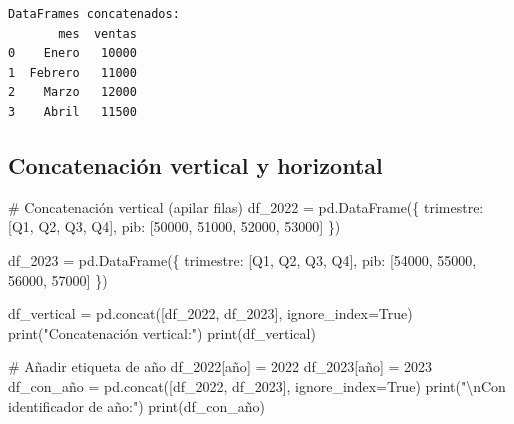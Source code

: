 \documentclass[
  doc,
  floatsintext,
  longtable,
  a4paper,
  nolmodern,
  notxfonts,
  notimes,
  12pt,
  colorlinks=true,linkcolor=blue,citecolor=blue,urlcolor=blue]{apa7}
\newenvironment{Shaded}{\begin{snugshade}}{\end{snugshade}}
\newcommand{\BuiltInTok}[1]{\textcolor[rgb]{0.00,0.23,0.31}{#1}}
\newcommand{\CharTok}[1]{\textcolor[rgb]{0.13,0.47,0.30}{#1}}
\newcommand{\CommentTok}[1]{\textcolor[rgb]{0.37,0.37,0.37}{#1}}
\newcommand{\DecValTok}[1]{\textcolor[rgb]{0.68,0.00,0.00}{#1}}
\newcommand{\NormalTok}[1]{\textcolor[rgb]{0.00,0.23,0.31}{#1}}
\newcommand{\OperatorTok}[1]{\textcolor[rgb]{0.37,0.37,0.37}{#1}}
\newcommand{\StringTok}[1]{\textcolor[rgb]{0.13,0.47,0.30}{#1}}
\newcommand{\VariableTok}[1]{\textcolor[rgb]{0.07,0.07,0.07}{#1}}
\begin{document}
\begin{verbatim}
DataFrames concatenados:
       mes  ventas
0    Enero   10000
1  Febrero   11000
2    Marzo   12000
3    Abril   11500
\end{verbatim}

\subsection{Concatenación vertical y
horizontal}\label{concatenaciuxf3n-vertical-y-horizontal}

\begin{Shaded}
\begin{Highlighting}[]
\CommentTok{\# Concatenación vertical (apilar filas)}
\NormalTok{df\_2022 }\OperatorTok{=}\NormalTok{ pd.DataFrame(\{}
    \StringTok{\textquotesingle{}trimestre\textquotesingle{}}\NormalTok{: [}\StringTok{\textquotesingle{}Q1\textquotesingle{}}\NormalTok{, }\StringTok{\textquotesingle{}Q2\textquotesingle{}}\NormalTok{, }\StringTok{\textquotesingle{}Q3\textquotesingle{}}\NormalTok{, }\StringTok{\textquotesingle{}Q4\textquotesingle{}}\NormalTok{],}
    \StringTok{\textquotesingle{}pib\textquotesingle{}}\NormalTok{: [}\DecValTok{50000}\NormalTok{, }\DecValTok{51000}\NormalTok{, }\DecValTok{52000}\NormalTok{, }\DecValTok{53000}\NormalTok{]}
\NormalTok{\})}

\NormalTok{df\_2023 }\OperatorTok{=}\NormalTok{ pd.DataFrame(\{}
    \StringTok{\textquotesingle{}trimestre\textquotesingle{}}\NormalTok{: [}\StringTok{\textquotesingle{}Q1\textquotesingle{}}\NormalTok{, }\StringTok{\textquotesingle{}Q2\textquotesingle{}}\NormalTok{, }\StringTok{\textquotesingle{}Q3\textquotesingle{}}\NormalTok{, }\StringTok{\textquotesingle{}Q4\textquotesingle{}}\NormalTok{],}
    \StringTok{\textquotesingle{}pib\textquotesingle{}}\NormalTok{: [}\DecValTok{54000}\NormalTok{, }\DecValTok{55000}\NormalTok{, }\DecValTok{56000}\NormalTok{, }\DecValTok{57000}\NormalTok{]}
\NormalTok{\})}

\NormalTok{df\_vertical }\OperatorTok{=}\NormalTok{ pd.concat([df\_2022, df\_2023], ignore\_index}\OperatorTok{=}\VariableTok{True}\NormalTok{)}
\BuiltInTok{print}\NormalTok{(}\StringTok{"Concatenación vertical:"}\NormalTok{)}
\BuiltInTok{print}\NormalTok{(df\_vertical)}

\CommentTok{\# Añadir etiqueta de año}
\NormalTok{df\_2022[}\StringTok{\textquotesingle{}año\textquotesingle{}}\NormalTok{] }\OperatorTok{=} \DecValTok{2022}
\NormalTok{df\_2023[}\StringTok{\textquotesingle{}año\textquotesingle{}}\NormalTok{] }\OperatorTok{=} \DecValTok{2023}
\NormalTok{df\_con\_año }\OperatorTok{=}\NormalTok{ pd.concat([df\_2022, df\_2023], ignore\_index}\OperatorTok{=}\VariableTok{True}\NormalTok{)}
\BuiltInTok{print}\NormalTok{(}\StringTok{"}\CharTok{\textbackslash{}n}\StringTok{Con identificador de año:"}\NormalTok{)}
\BuiltInTok{print}\NormalTok{(df\_con\_año)}


\end{Highlighting}
\end{Shaded}
\end{document}
